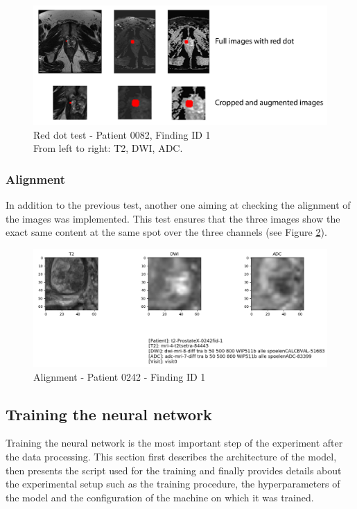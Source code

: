 \begin{figure}[!h]
\centering
\includegraphics[width=\textwidth, keepaspectratio=true]{./figures/test_red_dot.png}
\caption{Red dot test - Patient 0082, Finding ID 1\\From left to right: T2, DWI, ADC.}
\label{fig:reddot}
\end{figure}


\subsubsection{Alignment}
In addition to the previous test, another one aiming at checking the alignment of the images was implemented. This test ensures that the three images show the exact same content at the same spot over the three channels (see Figure \ref{fig:alignment}). 

\begin{figure}[!h]
\centering
\includegraphics[width=\textwidth, keepaspectratio=true]{./figures/alignment.png}
\caption{Alignment - Patient 0242 - Finding ID 1}
\label{fig:alignment}
\end{figure}

\subsection{Training the neural network}

\setlength{\marginparwidth}{3cm}\leavevmode {}Training the neural network is the most important step of the experiment after the data processing. This section first describes the architecture of the model, then presents the script used for the training and finally provides details about the experimental setup such as the training procedure, the hyperparameters of the model and the configuration of the machine on which it was trained.

